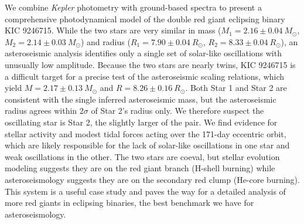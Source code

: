 We combine \emph{Kepler} photometry with ground-based spectra to present a comprehensive photodynamical model of the double red giant eclipsing binary KIC 9246715. While the two stars are very similar in mass ($M_1 = 2.16 \pm 0.04\ M_{\odot}$, $M_2 = 2.14 \pm 0.03\ M_{\odot}$) and radius ($R_1 = 7.90 \pm 0.04 \ R_{\odot}$, $R_2 = 8.33 \pm 0.04 \ R_{\odot}$), an asteroseismic analysis identifies only a single set of solar-like oscillations with unusually low amplitude. Because the two stars are nearly twins, KIC 9246715 is a difficult target for a precise test of the asteroseismic scaling relations, which yield $M = 2.17 \pm 0.13 \ M_{\odot}$ and $R = 8.26 \pm 0.16 \ R_{\odot}$. Both Star 1 and Star 2 are consistent with the single inferred asteroseismic mass, but the asteroseismic radius agrees within $2 \sigma$ of Star 2's radius only. We therefore suspect the oscillating star is Star 2, the slightly larger of the pair. We find evidence for stellar activity and modest tidal forces acting over the 171-day eccentric orbit, which are likely responsible for the lack of solar-like oscillations in one star and weak oscillations in the other. The two stars are coeval, but stellar evolution modeling suggests they are on the red giant branch (H-shell burning) while asteroseismology suggests they are on the secondary red clump (He-core burning). This system is a useful case study and paves the way for a detailed analysis of more red giants in eclipsing binaries, the best benchmark we have for asteroseismology.

